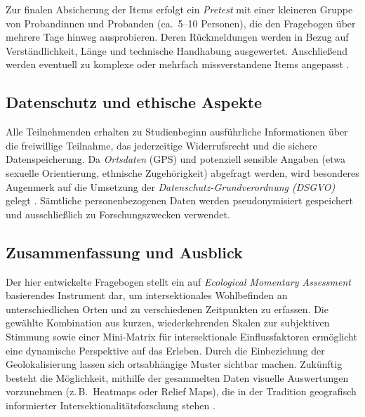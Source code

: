 Zur finalen Absicherung der Items erfolgt ein \emph{Pretest} mit einer kleineren Gruppe von Probandinnen und Probanden (ca.\ 5--10 Personen), die den Fragebogen über mehrere Tage hinweg ausprobieren. Deren Rückmeldungen werden in Bezug auf Verständlichkeit, Länge und technische Handhabung ausgewertet. Anschließend werden eventuell zu komplexe oder mehrfach missverstandene Items angepasst \parencite{krosnick_question_2009}.

\subsection{Datenschutz und ethische Aspekte}
Alle Teilnehmenden erhalten zu Studienbeginn ausführliche Informationen über die freiwillige Teilnahme, das jederzeitige Widerrufsrecht und die sichere Datenspeicherung. Da \emph{Ortsdaten} (GPS) und potenziell sensible Angaben (etwa sexuelle Orientierung, ethnische Zugehörigkeit) abgefragt werden, wird besonderes Augenmerk auf die Umsetzung der \emph{Datenschutz-Grundverordnung (DSGVO)} gelegt \parencite{noauthor_verordnung_2016}. Sämtliche personenbezogenen Daten werden pseudonymisiert gespeichert und ausschließlich zu Forschungszwecken verwendet.

\subsection{Zusammenfassung und Ausblick}
Der hier entwickelte Fragebogen stellt ein auf \emph{Ecological Momentary Assessment} basierendes Instrument dar, um intersektionales Wohlbefinden an unterschiedlichen Orten und zu verschiedenen Zeitpunkten zu erfassen. Die gewählte Kombination aus kurzen, wiederkehrenden Skalen zur subjektiven Stimmung sowie einer Mini-Matrix für intersektionale Einflussfaktoren ermöglicht eine dynamische Perspektive auf das Erleben. Durch die Einbeziehung der Geolokalisierung lassen sich ortsabhängige Muster sichtbar machen. Zukünftig besteht die Möglichkeit, mithilfe der gesammelten Daten visuelle Auswertungen vorzunehmen (z.\,B.\ Heatmaps oder Relief Maps), die in der Tradition geografisch informierter Intersektionalitätsforschung stehen \parencite{rodo-de-zarate_developing_2014}.
